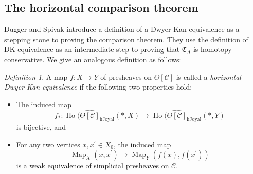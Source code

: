 \documentclass[leqno]{article}
\numberwithin{equation}{subsection}
\theoremstyle{plain}   %
\theoremstyle{remark}
\newtheorem{defn}[equation]{Definition}
\theoremstyle{plain}
\DeclareMathOperator{\Map}{Map}
\providecommand{\C}{}
\renewcommand{\C}{\ensuremath{\mathcal{C}}}
\newcommand{\cellset}{\ensuremath{\widehat{\Theta[\mathcal{C}]}}}
\begin{document}
\subsection{The horizontal comparison theorem}\label{horizcomparison}
Dugger and Spivak introduce a definition of a Dwyer-Kan equivalence as a stepping stone to proving the comparison theorem.  They use the definition of DK-equivalence as an intermediate step to proving that \(\mathfrak{C}_\Delta\) is homotopy-conservative.  We give an analogous definition as follows:

\begin{defn}
  A map \(f:X\to Y\) of presheaves on \(\Theta[\C]\) is called a \emph{horizontal Dwyer-Kan equivalence} if the following two properties hold:
	\begin{itemize}
		\item The induced map
		      \[f_*:\operatorname{Ho}(\cellset_{\mathrm{hJoyal}}(\ast,X) \to \operatorname{Ho}(\cellset_{\mathrm{hJoyal}}(\ast,Y)\]
		      is bijective, and
		\item For any two vertices \(x,x^\prime\in X_0\), the induced map
		      \[\Map_X(x,x^\prime) \to \Map_Y(f(x),f(x^\prime))\]
		      is a weak equivalence of simplicial presheaves on \(\C\).
	\end{itemize}
\end{defn}
\end{document}
